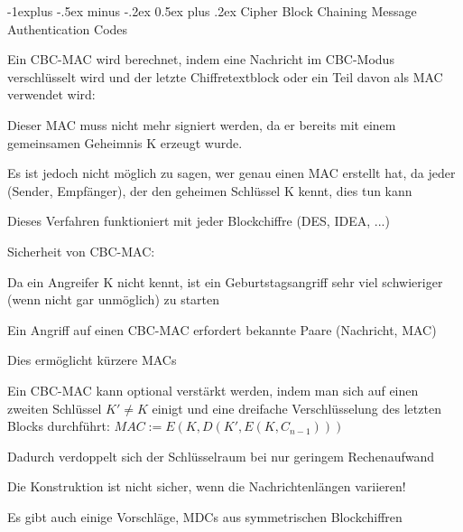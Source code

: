 \documentclass[a4paper]{article}
\makeatletter
\renewcommand{\subsection}{\@startsection{subsection}{2}{0mm}%
 {-1explus -.5ex minus -.2ex}%
 {0.5ex plus .2ex}%
 {\normalfont\normalsize\bfseries}}
\makeatother
\begin{document}
\begin{multicols}{3}
      \subsection{Cipher Block Chaining Message Authentication
            Codes}

      \begin{itemize*}
            \item Ein CBC-MAC wird berechnet, indem eine Nachricht im CBC-Modus
            verschlüsselt wird und der letzte Chiffretextblock oder ein Teil davon
            als MAC verwendet wird:
            \item Dieser MAC muss nicht mehr signiert werden, da er bereits mit einem
            gemeinsamen Geheimnis K erzeugt wurde.
            \begin{itemize*}
                  \item Es ist jedoch nicht möglich zu sagen, wer genau einen MAC erstellt hat, da jeder (Sender, Empfänger), der den geheimen Schlüssel K kennt, dies tun kann
            \end{itemize*}
            \item Dieses Verfahren funktioniert mit jeder Blockchiffre (DES, IDEA, ...)
            \item Sicherheit von CBC-MAC:
            \begin{itemize*}
                  \item Da ein Angreifer K nicht kennt, ist ein Geburtstagsangriff sehr viel schwieriger (wenn nicht gar unmöglich) zu starten
                  \item Ein Angriff auf einen CBC-MAC erfordert bekannte Paare (Nachricht, MAC)
                  \item Dies ermöglicht kürzere MACs
                  \item Ein CBC-MAC kann optional verstärkt werden, indem man sich auf einen zweiten Schlüssel $K'\not= K$ einigt und eine dreifache Verschlüsselung des letzten Blocks durchführt: $MAC:=E(K,D(K',E(K,C_{n-1})))$
                  \item Dadurch verdoppelt sich der Schlüsselraum bei nur geringem Rechenaufwand
                  \item Die Konstruktion ist nicht sicher, wenn die Nachrichtenlängen variieren!
            \end{itemize*}
            \item Es gibt auch einige Vorschläge, MDCs aus symmetrischen Blockchiffren

\end{itemize*}
\end{multicols}
\end{document}
